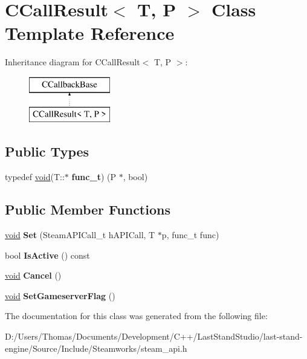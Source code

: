 \hypertarget{classCCallResult}{}\section{C\+Call\+Result$<$ T, P $>$ Class Template Reference}
\label{classCCallResult}
Inheritance diagram for C\+Call\+Result$<$ T, P $>$\+:\begin{figure}[H]
\begin{center}
\leavevmode
\includegraphics[height=2.000000cm]{classCCallResult}
\end{center}
\end{figure}
\subsection*{Public Types}
\begin{DoxyCompactItemize}
\item 
\hypertarget{classCCallResult_a41b25d59668e6a7dc6e339914f1b7c85}{}typedef \hyperlink{SDL__audio_8h_a52835ae37c4bb905b903cbaf5d04b05f}{void}(T\+::$\ast$ {\bfseries func\+\_\+t}) (P $\ast$, bool)\label{classCCallResult_a41b25d59668e6a7dc6e339914f1b7c85}

\end{DoxyCompactItemize}
\subsection*{Public Member Functions}
\begin{DoxyCompactItemize}
\item 
\hypertarget{classCCallResult_add408b4deb269334731a9a158bb4a514}{}\hyperlink{SDL__audio_8h_a52835ae37c4bb905b903cbaf5d04b05f}{void} {\bfseries Set} (Steam\+A\+P\+I\+Call\+\_\+t h\+A\+P\+I\+Call, T $\ast$p, func\+\_\+t func)\label{classCCallResult_add408b4deb269334731a9a158bb4a514}

\item 
\hypertarget{classCCallResult_ac6914123373bb18ead45fdd36a6ba81d}{}bool {\bfseries Is\+Active} () const \label{classCCallResult_ac6914123373bb18ead45fdd36a6ba81d}

\item 
\hypertarget{classCCallResult_a5ba0d59380bd9d81f73b4e17fbd3c0f1}{}\hyperlink{SDL__audio_8h_a52835ae37c4bb905b903cbaf5d04b05f}{void} {\bfseries Cancel} ()\label{classCCallResult_a5ba0d59380bd9d81f73b4e17fbd3c0f1}

\item 
\hypertarget{classCCallResult_a96c54ba74e77413dba916cd871d942a6}{}\hyperlink{SDL__audio_8h_a52835ae37c4bb905b903cbaf5d04b05f}{void} {\bfseries Set\+Gameserver\+Flag} ()\label{classCCallResult_a96c54ba74e77413dba916cd871d942a6}

\end{DoxyCompactItemize}


The documentation for this class was generated from the following file\+:\begin{DoxyCompactItemize}
\item 
D\+:/\+Users/\+Thomas/\+Documents/\+Development/\+C++/\+Last\+Stand\+Studio/last-\/stand-\/engine/\+Source/\+Include/\+Steamworks/steam\+\_\+api.\+h\end{DoxyCompactItemize}
